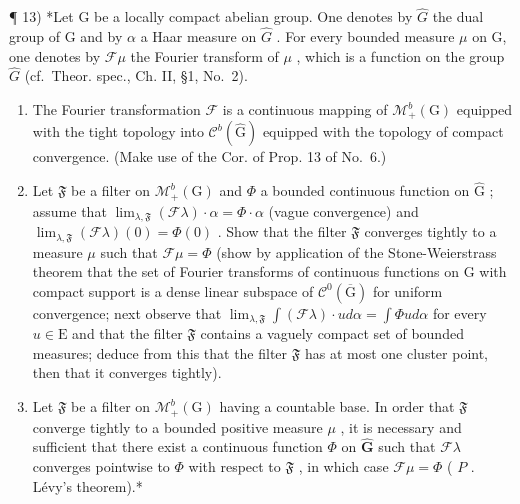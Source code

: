 ¶ 13) *Let G be a locally compact abelian group. One denotes by \(\widehat{G}\) the dual group of G and by \(\alpha\) a Haar measure on \(\widehat{G}\) . For every bounded measure \(\mu\) on G, one denotes by \(\mathcal{F}\mu\) the Fourier transform of \(\mu\) , which is a function on the group \(\widehat{G}\) (cf.~Theor. spec., Ch. II, §1, No.~2).

\begin{enumerate}
\def\labelenumi{\alph{enumi})}
\item
  The Fourier transformation \(\mathcal{F}\) is a continuous mapping of \(\mathcal{M}_{+}^{b}(\mathrm{G})\) equipped with the tight topology into \(\mathcal{C}^b (\widehat{\mathrm{G}})\) equipped with the topology of compact convergence. (Make use of the Cor. of Prop. 13 of No.~6.)
\item
  Let \(\mathfrak{F}\) be a filter on \(\mathcal{M}_+^b (\mathrm{G})\) and \(\Phi\) a bounded continuous function on \(\widehat{\mathrm{G}}\) ; assume that \(\lim_{\lambda ,\mathfrak{F}}(\mathcal{F}\lambda)\cdot \alpha = \Phi \cdot \alpha\) (vague convergence) and \(\lim_{\lambda ,\mathfrak{F}}(\mathcal{F}\lambda)(0) = \Phi (0)\) . Show that the filter \(\mathfrak{F}\) converges tightly to a measure \(\mu\) such that \(\mathcal{F}\mu = \Phi\) (show by application of the Stone-Weierstrass theorem that the set of Fourier transforms of continuous functions on G with compact support is a dense linear subspace of \(\mathcal{C}^0 (\overline{\mathrm{G}})\) for uniform convergence; next observe that \(\lim_{\lambda ,\mathfrak{F}}\int (\mathcal{F}\lambda)\cdot u d\alpha = \int \Phi u d\alpha\) for every \(u\in \mathrm{E}\) and that the filter \(\mathfrak{F}\) contains a vaguely compact set of bounded measures; deduce from this that the filter \(\mathfrak{F}\) has at most one cluster point, then that it converges tightly).
\item
  Let \(\mathfrak{F}\) be a filter on \(\mathcal{M}_{+}^{b}(\mathrm{G})\) having a countable base. In order that \(\mathfrak{F}\) converge tightly to a bounded positive measure \(\mu\) , it is necessary and sufficient that there exist a continuous function \(\Phi\) on \(\widehat{\mathbf{G}}\) such that \(\mathcal{F}\lambda\) converges pointwise to \(\Phi\) with respect to \(\mathfrak{F}\) , in which case \(\mathcal{F}\mu = \Phi\) ( \(P\) . Lévy's theorem).*
\end{enumerate}

